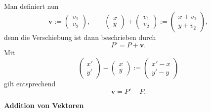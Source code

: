 \documentclass[9pt]{beamer}
\newcommand{\bv}[1]{\mathbf{#1}}
\newcommand{\strong}[1]{\textsf{\textbf{#1}}}
\begin{document}
\begin{frame}
Man definiert nun
\[\bv v := \begin{pmatrix}v_1\\ v_2\end{pmatrix},\qquad
\begin{pmatrix}x\\ y\end{pmatrix} + \begin{pmatrix}v_1\\ v_2\end{pmatrix}
:= \begin{pmatrix}x+v_1\\ y+v_2\end{pmatrix},\]
denn die Verschiebung ist dann beschrieben durch
\[P' = P + \bv v.\]\pause
Mit
\[\begin{pmatrix}x'\\ y'\end{pmatrix} - \begin{pmatrix}x\\ y\end{pmatrix}
:= \begin{pmatrix}x'-x\\ y'-y\end{pmatrix}\]
gilt entsprechend
\[\bv v = P' - P.\]
\end{frame}

\begin{frame}
\begin{center}
\strong{Addition von Vektoren}
\end{center}
\end{frame}
\end{document}

